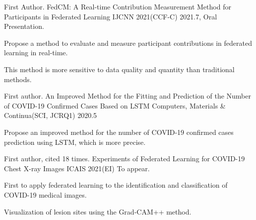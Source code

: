 

\begin{cventries}
	\cventry
	{First Author.} %
	{FedCM: A Real-time Contribution Measurement Method for Participants in Federated Learning} %
	{IJCNN 2021(CCF-C)} %
	{2021.7, Oral Presentation.} %
	{
		\begin{cvitems} %
			\item {Propose a method to evaluate and measure participant contributions in federated learning in real-time.}
			\item {This method is more sensitive to data quality and quantity than traditional methods.}
		\end{cvitems}
	}

	\cventry
	{First author.} %
	{An Improved Method for the Fitting and Prediction of the Number of COVID-19 Confirmed Cases Based on LSTM} %
	{Computers, Materials \& Continua(SCI, JCRQ1)} %
	{2020.5} %
	{
		\begin{cvitems} %
			\item {Propose an improved method for the number of COVID-19 confirmed cases prediction using LSTM, which is more precise.}
		\end{cvitems}
	}

	\cventry
	{First author, cited 18 times.} %
	{Experiments of Federated Learning for COVID-19 Chest X-ray Images} %
	{ICAIS 2021(EI)} %
	{To appear.} %
	{
		\begin{cvitems} %
			\item {First to apply federated learning to the identification and classification of COVID-19 medical images.}
			\item {Visualization of lesion sites using the Grad-CAM++ method.}
		\end{cvitems}
	}

\end{cventries}
